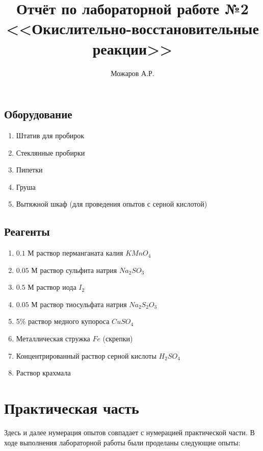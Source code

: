 \documentclass[a4paper]{article}
\title{Отчёт по лабораторной работе №2\\
<<Окислительно-восстановительные реакции>>}
\author{Можаров А.Р.}
\newcommand{\M}{\text{ М}}
\begin{document}
\maketitle

\subsection*{Оборудование}

\begin{enumerate}
    \item Штатив для пробирок
    \item Стеклянные пробирки
    \item Пипетки
    \item Груша
    \item Вытяжной шкаф (для проведения опытов с серной кислотой)
\end{enumerate}

\subsection*{Реагенты}

\begin{enumerate}
    \item $0.1\M$ раствор перманганата калия $KMnO_4$
    \item $0.05\M$ раствор сульфита натрия $Na_2SO_3$
    \item $0.5\M$ раствор иода $I_2$
    \item $0.05\M$ раствор тиосульфата натрия $Na_2S_2O_3$
    \item 5\% раствор медного купороса $CuSO_4$
    \item Металлическая стружка $Fe$ (скрепки)
    \item Концентрированный раствор серной кислоты $H_2SO_4$
    \item Раствор крахмала
\end{enumerate}

\section*{\centering Практическая часть}

Здесь и далее нумерация опытов совпадает с нумерацией практической части.
В ходе выполнения лабораторной работы были проделаны следующие опыты:
\end{document}
